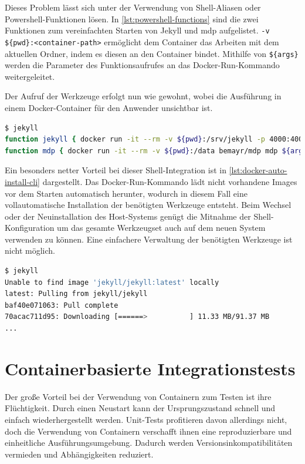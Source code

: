 Dieses Problem lässt sich unter der Verwendung von Shell-Aliasen oder Powershell-Funktionen lösen.
In \cref{lst:powershell-functions} sind die zwei Funktionen zum vereinfachten Starten von Jekyll und mdp aufgelistet.
\texttt{-v \$\{pwd\}:<container-path>} ermöglicht dem Container das Arbeiten mit dem aktuellen Ordner, indem es diesen an den Container bindet.
Mithilfe von \texttt{\$\{args\}} werden die Parameter des Funktionsaufrufes an das Docker-Run-Kommando weitergeleitet.

Der Aufruf der Werkzeuge erfolgt nun wie gewohnt, wobei die Ausführung in einem Docker-Container für den Anwender unsichtbar ist.

\begin{lstlisting}[caption=Powershell-Funktionen für Docker-Kommandos, language=bash, label=lst:powershell-functions]
$ jekyll
function jekyll { docker run -it --rm -v ${pwd}:/srv/jekyll -p 4000:4000 jekyll/jekyll /usr/local/bin/jekyll ${args} }
function mdp { docker run -it --rm -v ${pwd}:/data bemayr/mdp mdp ${args} }
\end{lstlisting}
Ein besonders netter Vorteil bei dieser Shell-Integration ist in \cref{lst:docker-auto-install-cli} dargestellt.
Das Docker-Run-Kommando lädt nicht vorhandene Images vor dem Starten automatisch herunter, wodurch in diesem Fall eine vollautomatische Installation der benötigten Werkzeuge entsteht.
Beim Wechsel oder der Neuinstallation des Host-Systems genügt die Mitnahme der Shell-Konfiguration um das gesamte Werkzeugset auch auf dem neuen System verwenden zu können.
Eine einfachere Verwaltung der benötigten Werkzeuge ist nicht möglich.

\begin{lstlisting}[caption=Automatische Installation der Docker-basierten CLI-Anwendungen, language=bash, label=lst:docker-auto-install-cli]
$ jekyll
Unable to find image 'jekyll/jekyll:latest' locally
latest: Pulling from jekyll/jekyll
baf40e071063: Pull complete
70acac711d95: Downloading [======>          ] 11.33 MB/91.37 MB
...
\end{lstlisting}

\section{Containerbasierte Integrationstests}
\label{sec:containerbasiertes-integrationstests}
Der große Vorteil bei der Verwendung von Containern zum Testen ist ihre Flüchtigkeit.
Durch einen Neustart kann der Ursprungszustand schnell und einfach wiederhergestellt werden.
Unit-Tests profitieren davon allerdings nicht, doch die Verwendung von Containern verschafft ihnen eine reproduzierbare und einheitliche Ausführungsumgebung.
Dadurch werden Versionsinkompatibilitäten vermieden und Abhängigkeiten reduziert.

